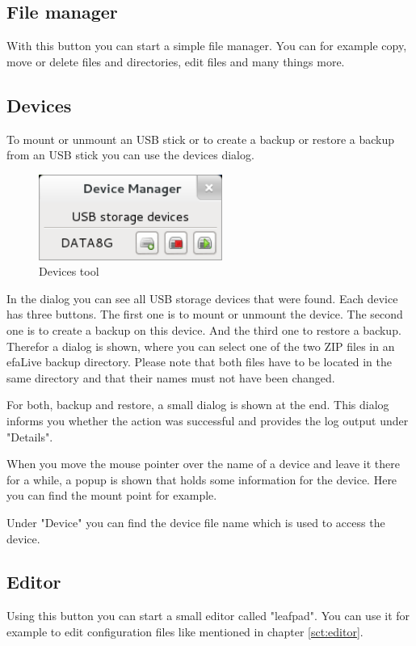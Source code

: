 \documentclass[a4paper,12pt,twoside]{article}
\begin{document}
\subsection{File manager}
\label{sct:file_manager}
With this button you can start a simple file manager. You can for
example copy, move or delete files and directories, edit files and many
things more.

\subsection{Devices}
\label{sct:dialog_devices}
To mount or unmount an USB stick or
to create a backup or restore a backup from an USB stick you can use
the devices dialog.

\begin{figure}
    \centering
    \includegraphics[width=6cm]{efaLiveen-img/efaLiveen-img21.png}
    \caption{Devices tool}
    \label{fig:dialog_devices}
\end{figure}

In the dialog you can see all USB storage devices that were found. Each
device has three buttons. The first one is to mount or unmount the
device. The second one is to create a backup on this device. And the
third one to restore a backup. Therefor a dialog is shown, where you
can select one of the two ZIP files in an efaLive backup directory.
Please note that both files have to be located in the same directory
and that their names must not have been changed.

For both, backup and restore, a small dialog is shown at the end. This
dialog informs you whether the action was successful and provides the
log output under "Details".

When you move the mouse pointer over the name of a device and leave it
there for a while, a popup is shown that holds some information for the
device. Here you can find the mount point for example.

Under "Device" you can find the device file
name which is used to access the device.


\subsection{Editor}
\label{sct:gui_editor}
Using this button you can start a
small editor called "leafpad". You can use
it for example to edit configuration files like mentioned in chapter
\ref{sct:editor}.
\end{document}
